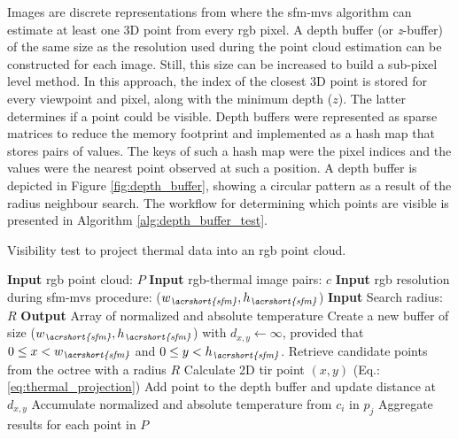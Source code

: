 Images are discrete representations from where the \acrshort{sfm}-\acrshort{mvs} algorithm can estimate at least one 3D point from every \acrshort{rgb} pixel. A depth buffer (or \textit{z}-buffer) of the same size as the resolution used during the point cloud estimation can be constructed for each image. Still, this size can be increased to build a sub-pixel level method. In this approach, the index of the closest 3D point is stored for every viewpoint and pixel, along with the minimum depth ($\textit{z}$). The latter determines if a point could be visible. Depth buffers were represented as sparse matrices to reduce the memory footprint and implemented as a hash map that stores pairs of values. The keys of such a hash map were the pixel indices and the values were the nearest point observed at such a position. A depth buffer is depicted in Figure \ref{fig:depth_buffer}, showing a circular pattern as a result of the radius neighbour search. The workflow for determining which points are visible is presented in Algorithm \ref{alg:depth_buffer_test}.  

\begin{algorithm}
    \small
	\caption{Visibility test to project thermal data into an \acrshort{rgb} point cloud. }
	\label{alg:depth_buffer_test}
    \begin{algorithmic}[1]
        \State \textbf{Input} \acrshort{rgb} point cloud: $P$
    	\State \textbf{Input} \acrshort{rgb}-thermal image pairs: $c$
    	\State \textbf{Input} \acrshort{rgb} resolution during \acrshort{sfm}-\acrshort{mvs} procedure: ($w_{\textit{\acrshort{sfm}}}, h_{\textit{\acrshort{sfm}}}$)
    	\State \textbf{Input} Search radius: $R$
        \State \textbf{Output} Array of normalized and absolute temperature
		    \State Create a new buffer of size ($w_{\textit{\acrshort{sfm}}}, h_{\textit{\acrshort{sfm}}}$) with $d_{x,y} \gets \infty$, provided that $0 \leq x < w_{\textit{\acrshort{sfm}}}$ and $0 \leq y < h_{\textit{\acrshort{sfm}}}$.
		    \State Retrieve candidate points from the octree with a radius $R$  %
		        \State Calculate 2D \acrshort{tir} point $(x, y)$ (Eq.: \ref{eq:thermal_projection})
		                \State Add point to the depth buffer and update distance at $d_{x, y}$
	    	        \EndIf
	    	    \EndIf
		    \EndFor
		        \State Accumulate normalized and absolute temperature from $c_i$ in $p_j$
		    \EndFor
		\EndFor
		\State Aggregate results for each point in $P$%
	\end{algorithmic} 
    \normalsize
\end{algorithm}

